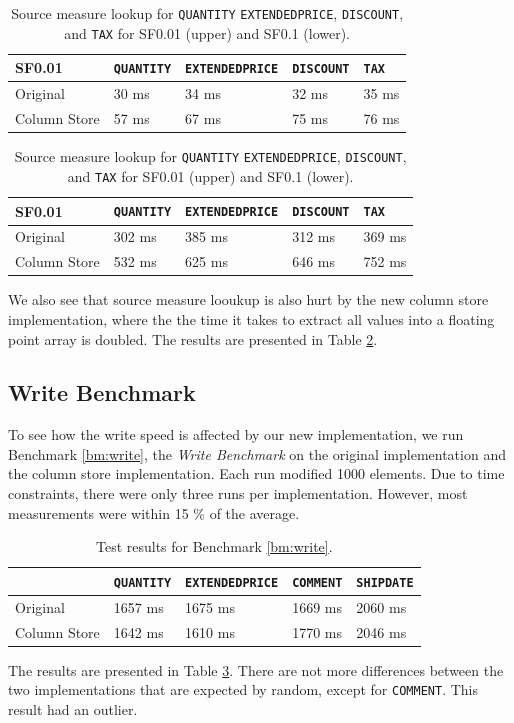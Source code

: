 \begin{table}
    \centering
    \begin{tabularx}{\textwidth}{X | X X X X}
        SF0.01 & \texttt{QUANTITY} & \texttt{EXTENDEDPRICE} & \texttt{DISCOUNT} & \texttt{TAX}\\ 
        \hline
        \hline
        Original & 30 ms & 34 ms & 32 ms & 35 ms \\
        Column Store & 57 ms & 67 ms & 75 ms & 76 ms
    \end{tabularx}
    \newline
    \vspace*{1 cm}
    \newline
    \begin{tabularx}{\textwidth}{X | X X X X}
        SF0.01 & \texttt{QUANTITY} & \texttt{EXTENDEDPRICE} & \texttt{DISCOUNT} & \texttt{TAX}\\ 
        \hline
        \hline
        Original & 302 ms & 385 ms & 312 ms & 369 ms \\
        Column Store & 532 ms & 625 ms & 646 ms & 752 ms
    \end{tabularx}
    \caption{Source measure lookup for \texttt{QUANTITY} \texttt{EXTENDEDPRICE}, \texttt{DISCOUNT}, and \texttt{TAX} for SF0.01 (upper) and SF0.1 (lower).} 
    \label{tab:non-blackbox-sml}
\end{table}
We also see that source measure looukup is also hurt by the new column store implementation, where the the time it takes to extract all values into a floating point array is doubled. The results are presented in Table \ref{tab:non-blackbox-sml}.

\subsection{Write Benchmark}
\label{sub:Write Benchmark}
To see how the write speed is affected by our new implementation, we run Benchmark \ref{bm:write}, the \textit{Write Benchmark} on the original implementation and the column store implementation. Each run modified 1000 elements. Due to time constraints, there were only three runs per implementation. However, most measurements were within 15 \% of the average.

\begin{table}
    \begin{tabularx}{\textwidth}{X | X X X X}
         & \texttt{QUANTITY} & \texttt{EXTENDEDPRICE} & \texttt{COMMENT} & \texttt{SHIPDATE}\\ 
        \hline
        \hline
        Original & 1657 ms & 1675 ms & 1669 ms & 2060 ms \\
        Column Store & 1642 ms & 1610 ms & 1770 ms & 2046 ms
    \end{tabularx}
    \caption{Test results for Benchmark \ref{bm:write}.}
    \label{tab:non-blackbox-write}
\end{table}
The results are presented in Table \ref{tab:non-blackbox-write}. There are not more differences between the two implementations that are expected by random, except for \texttt{COMMENT}. This result had an outlier.

